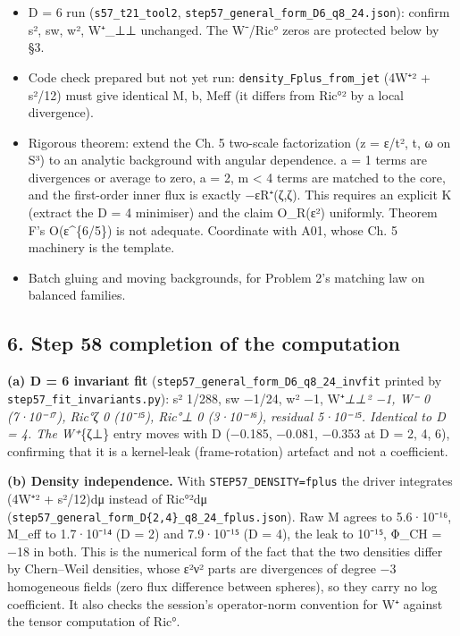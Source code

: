 \documentclass[
  10pt,
]{report}
\providecommand{\tightlist}{%
  \setlength{\itemsep}{0pt}\setlength{\parskip}{0pt}}
\begin{document}
\begin{itemize}
\tightlist
\item
  D = 6 run (\texttt{s57\_t21\_tool2},
  \texttt{step57\_general\_form\_D6\_q8\_24.json}): confirm s², sw, w²,
  W⁺\_⊥⊥ unchanged. The W⁻/Ric° zeros are protected below by §3.
\item
  Code check prepared but not yet run:
  \texttt{density\_Fplus\_from\_jet} (4\textbar W⁺\textbar² + s²/12)
  must give identical M, b, Meff (it differs from \textbar Ric°\textbar²
  by a local divergence).
\item
  Rigorous theorem: extend the Ch. 5 two-scale factorization (z = ε/t²,
  t, ω on S³) to an analytic background with angular dependence. a = 1
  terms are divergences or average to zero, a = 2, m \textless{} 4 terms
  are matched to the core, and the first-order inner flux is exactly
  −εR⁺(ζ,ζ). This requires an explicit K (extract the D = 4 minimiser)
  and the claim O\_R(ε²) uniformly. Theorem F's O(ε\^{}\{6/5\}) is not
  adequate. Coordinate with A01, whose Ch. 5 machinery is the template.
\item
  Batch gluing and moving backgrounds, for Problem 2's matching law on
  balanced families.
\end{itemize}

\hypertarget{step-58-completion-of-the-computation}{%
\subsection{6. Step 58 completion of the
computation}\label{step-58-completion-of-the-computation}}

\textbf{(a) D = 6 invariant fit}
(\texttt{step57\_general\_form\_D6\_q8\_24\_invfit} printed by
\texttt{step57\_fit\_invariants.py}): s² 1/288, sw −1/24, w² −1,
\textbar W⁺\emph{⊥⊥\textbar² −1, W⁻ 0 (7·10⁻¹⁷), Ric°\emph{ζ 0 (10⁻¹⁵),
Ric°}⊥ 0 (3·10⁻¹⁶), residual 5·10⁻¹⁵. Identical to D = 4. The W⁺}\{ζ⊥\}
entry moves with D (−0.185, −0.081, −0.353 at D = 2, 4, 6), confirming
that it is a kernel-leak (frame-rotation) artefact and not a
coefficient.

\textbf{(b) Density independence.} With \texttt{STEP57\_DENSITY=fplus}
the driver integrates (4\textbar W⁺\textbar² + s²/12)dμ instead of
\textbar Ric°\textbar²dμ
(\texttt{step57\_general\_form\_D\{2,4\}\_q8\_24\_fplus.json}). Raw M
agrees to 5.6·10⁻¹⁶, M\_eff to 1.7·10⁻¹⁴ (D = 2) and 7.9·10⁻¹⁵ (D = 4),
the leak to 10⁻¹⁵, Φ\_CH = −18 in both. This is the numerical form of
the fact that the two densities differ by Chern--Weil densities, whose
ε²ν² parts are divergences of degree −3 homogeneous fields (zero flux
difference between spheres), so they carry no log coefficient. It also
checks the session's operator-norm convention for W⁺ against the tensor
computation of Ric°.
\end{document}
